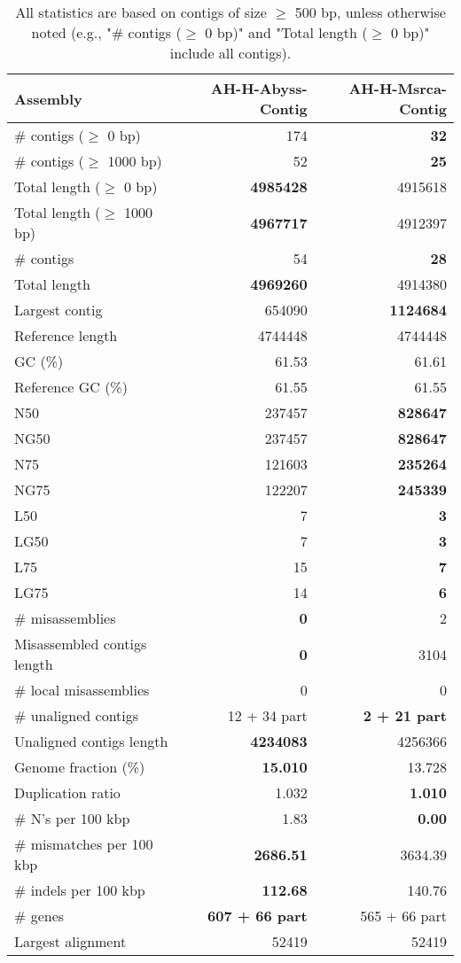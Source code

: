 \documentclass[12pt,a4paper]{article}
\begin{document}
\begin{table}[ht]
\begin{center}
\caption{All statistics are based on contigs of size $\geq$ 500 bp, unless otherwise noted (e.g., "\# contigs ($\geq$ 0 bp)" and "Total length ($\geq$ 0 bp)" include all contigs).}
\begin{tabular}{|l*{2}{|r}|}
\hline
Assembly & AH-H-Abyss-Contig & AH-H-Msrca-Contig \\ \hline
\# contigs ($\geq$ 0 bp) & 174 & {\bf 32} \\ \hline
\# contigs ($\geq$ 1000 bp) & 52 & {\bf 25} \\ \hline
Total length ($\geq$ 0 bp) & {\bf 4985428} & 4915618 \\ \hline
Total length ($\geq$ 1000 bp) & {\bf 4967717} & 4912397 \\ \hline
\# contigs & 54 & {\bf 28} \\ \hline
Total length & {\bf 4969260} & 4914380 \\ \hline
Largest contig & 654090 & {\bf 1124684} \\ \hline
Reference length & 4744448 & 4744448 \\ \hline
GC (\%) & 61.53 & 61.61 \\ \hline
Reference GC (\%) & 61.55 & 61.55 \\ \hline
N50 & 237457 & {\bf 828647} \\ \hline
NG50 & 237457 & {\bf 828647} \\ \hline
N75 & 121603 & {\bf 235264} \\ \hline
NG75 & 122207 & {\bf 245339} \\ \hline
L50 & 7 & {\bf 3} \\ \hline
LG50 & 7 & {\bf 3} \\ \hline
L75 & 15 & {\bf 7} \\ \hline
LG75 & 14 & {\bf 6} \\ \hline
\# misassemblies & {\bf 0} & 2 \\ \hline
Misassembled contigs length & {\bf 0} & 3104 \\ \hline
\# local misassemblies & 0 & 0 \\ \hline
\# unaligned contigs & 12 + 34 part & {\bf 2 + 21 part} \\ \hline
Unaligned contigs length & {\bf 4234083} & 4256366 \\ \hline
Genome fraction (\%) & {\bf 15.010} & 13.728 \\ \hline
Duplication ratio & 1.032 & {\bf 1.010} \\ \hline
\# N's per 100 kbp & 1.83 & {\bf 0.00} \\ \hline
\# mismatches per 100 kbp & {\bf 2686.51} & 3634.39 \\ \hline
\# indels per 100 kbp & {\bf 112.68} & 140.76 \\ \hline
\# genes & {\bf 607 + 66 part} & 565 + 66 part \\ \hline
Largest alignment & 52419 & 52419 \\ \hline
\end{tabular}
\end{center}
\end{table}
\end{document}
